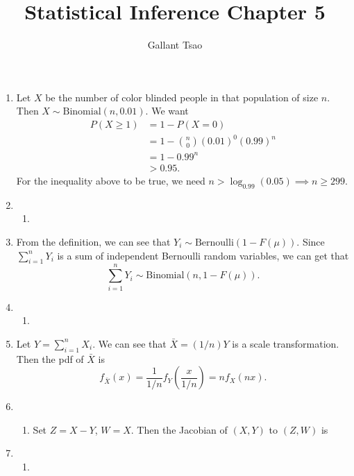 \documentclass{article}
\title{Statistical Inference Chapter 5}
\author{Gallant Tsao}
\begin{document}
\maketitle

\begin{enumerate}
    \item Let $X$ be the number of color blinded people in that population of size $n$. Then 
    $X \sim \text{Binomial}(n, 0.01)$. We want 
    \begin{align*}
        P(X \geq 1) 
        &= 1 - P(X = 0) \\
        &= 1 - \binom{n}{0}(0.01)^{0}(0.99)^{n} \\
        &= 1 - 0.99^{n} \\
        &> 0.95.
    \end{align*}
    For the inequality above to be true, we need $n > \log_{0.99}(0.05) \implies n \geq 299$.

    \item \begin{enumerate}
        \item 
    \end{enumerate}

    \item From the definition, we can see that $Y_i \sim \text{Bernoulli}(1 - F(\mu))$. 
    Since 
    $\sum_{i = 1}^{n} Y_{i}$ is a sum of independent Bernoulli random variables, we can get 
    that \[ \sum_{i = 1}^{n} Y_{i} \sim \text{Binomial}(n, 1 - F(\mu)). \]

    \item \begin{enumerate}
        \item 
    \end{enumerate}

    \item Let $Y = \sum_{i = 1}^{n} X_i$. We can see that 
    $\bar{X} = (1/n)Y$ is a scale transformation. Then the pdf of $\bar{X}$ is 
    \[ f_{\bar{X}}(x) = \frac{1}{1/n} f_{Y}(\frac{x}{1/n}) = nf_{X}(nx). \]

    \item \begin{enumerate}
        \item Set $Z = X - Y$, $W = X$. Then the Jacobian of $(X, Y)$ to $(Z, W)$ is 
    \end{enumerate}

    \item \begin{enumerate}
        \item 
    \end{enumerate}


\end{enumerate}
\end{document}
